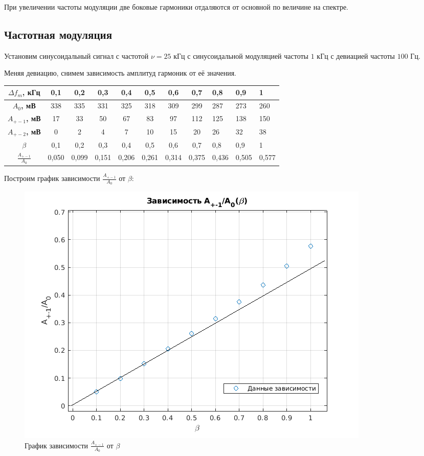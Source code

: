 \documentclass[a4paper, 12pt]{article}%
\begin{document}
При увеличении частоты модуляции две боковые гармоники отдаляются от основной по величине на спектре.

\subsection{Частотная модуляция}

Установим синусоидальный сигнал с частотой $\nu = 25$ кГц с синусоидальной модуляцией частоты $1$ кГц с девиацией частоты $100$ Гц.

Меняя девиацию, снимем зависимость амплитуд гармоник от её значения.

\begin{table}[!h]
    \centering
    \begin{tabular}{|c|c|c|c|c|c|c|c|l|l|l|}
        \hline
        \textbf{$\Delta f_m$, кГц}       & 0,1   & 0,2   & 0,3   & 0,4   & 0,5   & 0,6   & 0,7   & 0,8   & 0,9   & 1     \\ \hline
        \textbf{$A_0$, мВ}               & 338   & 335   & 331   & 325   & 318   & 309   & 299   & 287   & 273   & 260   \\ \hline
        \textbf{$A_{+-1}$, мВ}           & 17    & 33    & 50    & 67    & 83    & 97    & 112   & 125   & 138   & 150   \\ \hline
        \textbf{$A_{+-2}$, мВ}           & 0     & 2     & 4     & 7     & 10    & 15    & 20    & 26    & 32    & 38    \\ \hline
        \textbf{$\beta$}                 & 0,1   & 0,2   & 0,3   & 0,4   & 0,5   & 0,6   & 0,7   & 0,8   & 0,9   & 1     \\ \hline
        \textbf{$\frac{A_{+-1}}{A_{0}}$} & 0,050 & 0,099 & 0,151 & 0,206 & 0,261 & 0,314 & 0,375 & 0,436 & 0,505 & 0,577 \\ \hline
    \end{tabular}
\end{table}

Построим график зависимости $\frac{A_{+-1}}{A_{0}}$ от $\beta$:

\begin{figure}[!h]
    \centering
    \includegraphics[width = 13 cm]{images/4_appr.png}
    \caption{График зависимости $\frac{A_{+-1}}{A_{0}}$ от $\beta$}
\end{figure}
\end{document}
